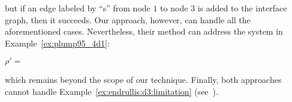       but if an edge labeled by ``s'' from node $1$ to node $3$ is added to the interface graph, then it succeeds. Our approach, however, can handle all the aforementioned cases. Nevertheless, their method can address the system in Example~\ref{ex:plump95_4d1}:
        \begin{center}
    $\rho'\mathop{=}$\scalebox{0.9} { }
  \end{center} 
which remains beyond the scope of our technique. Finally, both approaches cannot handle Example~\ref{ex:endrullis:d3:limitation} (see~\cite[Remark 6.2]{overbeek2024termination_lmcs}).

